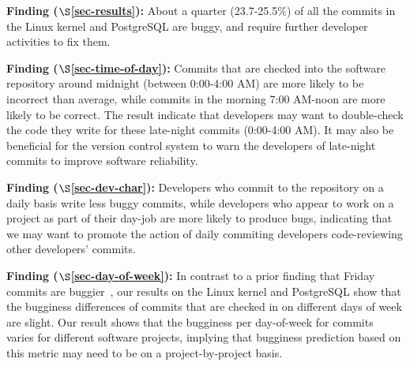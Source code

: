 \begin{list}{}{\topsep=0pt\parsep=0pt\leftmargin=9pt\itemindent=0pt}

\item {\bf Finding \fbuggy ($\S$\ref{sec-results}):} 
About a quarter (23.7-25.5\%) of all the commits in the Linux kernel and PostgreSQL are buggy, 
and require further developer activities to fix them.

\item {\bf Finding \fhour ($\S$\ref{sec-time-of-day}):} 
Commits that are checked into the software repository around midnight (between 0:00-4:00 AM) 
are more likely to be incorrect than average, while commits in the morning 7:00 AM-noon 
are more likely to be correct.
The result indicate that developers may want to double-check the code they write for these 
late-night commits (0:00-4:00 AM).
It may also be beneficial for the version control
system to warn the developers of late-night commits to improve software reliability. 


\item {\bf Finding \fdaily ($\S$\ref{sec-dev-char}):} 
Developers who commit to the repository on a daily basis
write less buggy commits, while developers who appear to work on a project
as part of their day-job are more likely to produce
bugs, indicating that we may 
want to promote the action of daily commiting developers code-reviewing other 
developers' commits.


\item {\bf Finding \fday ($\S$\ref{sec-day-of-week}):} 
In contrast to a prior finding that Friday commits are buggier~\cite{sliwerski-msr-2005}, 
our results on the Linux kernel and PostgreSQL show that 
the bugginess differences of commits that are checked in on different days of week 
are slight. Our result shows that the bugginess per day-of-week for commits
varies for different software projects, implying that bugginess prediction based on this 
metric may need to be on a project-by-project basis.

\end{list}


